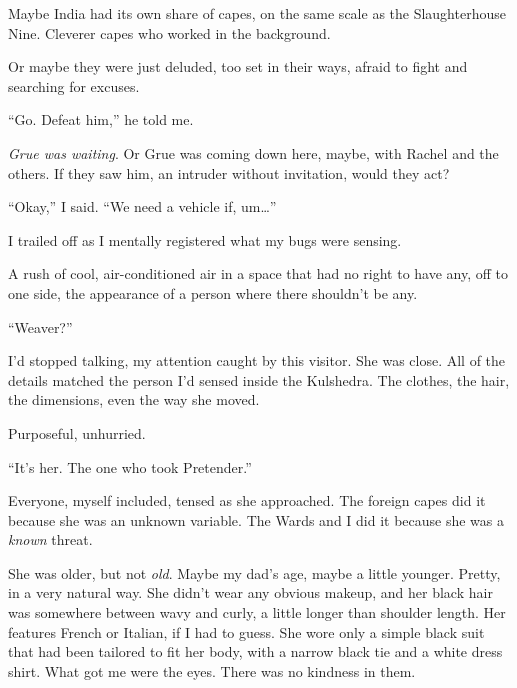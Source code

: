 Maybe India had its own share of capes, on the same scale as the Slaughterhouse Nine.  Cleverer capes who worked in the background.



Or maybe they were just deluded, too set in their ways, afraid to fight and searching for excuses.



``Go.  Defeat him,'' he told me.



\emph{Grue was waiting}.  Or Grue was coming down here, maybe, with Rachel and the others.  If they saw him, an intruder without invitation, would they act?



``Okay,'' I said.  ``We need a vehicle if, um\ldots''



I trailed off as I mentally registered what my bugs were sensing.



A rush of cool, air-conditioned air in a space that had no right to have any, off to one side, the appearance of a person where there shouldn't be any.



``Weaver?''



I'd stopped talking, my attention caught by this visitor.  She was close.  All of the details matched the person I'd sensed inside the Kulshedra.  The clothes, the hair, the dimensions, even the way she moved.



Purposeful, unhurried.



``It's her.  The one who took Pretender.''



Everyone, myself included, tensed as she approached.  The foreign capes did it because she was an unknown variable.  The Wards and I did it because she was a \emph{known} threat.



She was older, but not \emph{old}.  Maybe my dad's age, maybe a little younger.  Pretty, in a very natural way.  She didn't wear any obvious makeup, and her black hair was somewhere between wavy and curly, a little longer than shoulder length.  Her features French or Italian, if I had to guess.  She wore only a simple black suit that had been tailored to fit her body, with a narrow black tie and a white dress shirt.  What got me were the eyes.  There was no kindness in them.



